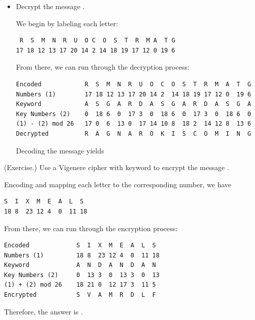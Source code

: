 \documentclass[letterpaper]{article}
\begin{document}
\begin{mdframed}
\begin{itemize}
        \item Decrypt the message .
        \begin{mdframed}
            We begin by labeling each letter: 
            \begin{mdframed}
                \begin{verbatim}
 R  S  M  N  R  U  O C  O  S  T  R  M A  T G
17 18 12 13 17 20 14 2 14 18 19 17 12 0 19 6\end{verbatim}
            \end{mdframed}
            From there, we can run through the decryption process: 
            \begin{mdframed}
\begin{verbatim}
Encoded            R  S  M  N  R  U  O  C  O  S  T  R  M  A  T  G
Numbers (1)        17 18 12 13 17 20 14 2  14 18 19 17 12 0  19 6
Keyword            A  S  G  A  R  D  A  S  G  A  R  D  A  S  G  A 
Key Numbers (2)    0  18 6  0  17 3  0  18 6  0  17 3  0  18 6  0 
(1) - (2) mod 26   17 0  6  13 0  17 14 10 8  18 2  14 12 8  13 6
Decrypted          R  A  G  N  A  R  O  K  I  S  C  O  M  I  N  G\end{verbatim}
            \end{mdframed}
            Decoding the message yields
            \begin{mdframed}
            \end{mdframed}
        \end{mdframed}
    \end{itemize}
\end{mdframed}

\begin{mdframed}
    (Exercise.) Use a Vigenere cipher with keyword  to encrypt the message . 

    \begin{mdframed}
        Encoding and mapping each letter to the corresponding number, we have 
        \begin{mdframed}
            \begin{verbatim}
S  I  X  M  E  A  L  S
18 8  23 12 4  0  11 18\end{verbatim}
        \end{mdframed}

        From there, we can run through the encryption process: 
        \begin{mdframed}
            \begin{verbatim}
Encoded             S  I  X  M  E  A  L  S
Numbers (1)         18 8  23 12 4  0  11 18
Keyword             A  N  D  A  N  D  A  N
Key Numbers (2)     0  13 3  0  13 3  0  13
(1) + (2) mod 26    18 21 0  12 17 3  11 5
Encrypted           S  V  A  M  R  D  L  F\end{verbatim}
        \end{mdframed}
        Therefore, the answer is .
    \end{mdframed}
\end{mdframed}
\end{document}

